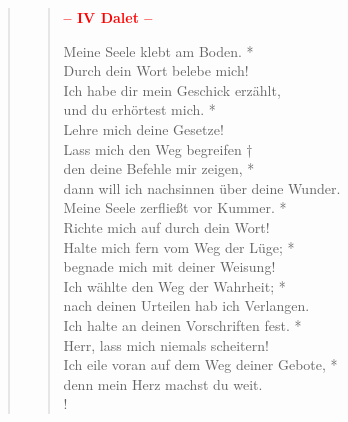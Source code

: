 \begin{quote}
\begin{verse}
\end{verse}

\begin{verse}

\begin{center}
 \textcolor{red}{\normalsize\bf – IV Dalet –}\\
\end{center}

Meine Seele klebt am Boden. *\\
Durch dein Wort belebe mich!\\
\vin Ich habe dir mein Geschick erzählt,\\
\vin und du erhörtest mich. *\\
\vin Lehre mich deine Gesetze!\\
Lass mich den Weg begreifen †\\
den deine Befehle mir zeigen, *\\
dann will ich nachsinnen über deine Wunder.\\
\vin Meine Seele zerfließt vor Kummer. *\\
\vin Richte mich auf durch dein Wort!\\
Halte mich fern vom Weg der Lüge; *\\
begnade mich mit deiner Weisung!\\
\vin Ich wählte den Weg der Wahrheit; *\\
\vin nach deinen Urteilen hab ich Verlangen.\\
Ich halte an deinen Vorschriften fest. *\\
Herr, lass mich niemals scheitern!\\
\vin Ich eile voran auf dem Weg deiner Gebote, *\\
\vin denn mein Herz machst du weit.\\!

\end{verse}
\end{quote}